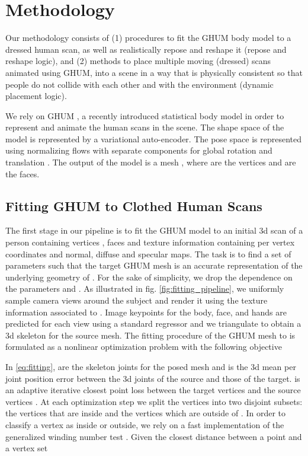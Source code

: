 \documentclass[10pt,twocolumn,letterpaper]{article}
\begin{document}
\section{Methodology}

Our methodology consists of (1) procedures to fit the GHUM body model to a dressed human scan, as well as realistically repose and reshape it (repose and reshape logic), and (2) methods to place multiple moving (dressed) scans animated using GHUM, into a scene in a way that is physically consistent so that people do not collide with each other and with the environment (dynamic placement logic).

 We rely on GHUM \cite{ghum2020}, a recently introduced statistical body model in order to represent and animate the human scans in the scene. The shape space  of the model is represented by a variational auto-encoder.
The pose space  is represented using normalizing flows \cite{zanfir2020weakly} with separate components for global rotation   \cite{zhou2018continuity} and translation . The output of the model is a mesh , where  are the vertices and  are the  faces.

\subsection{Fitting GHUM to Clothed Human Scans}
The first stage in our pipeline is to fit the GHUM\cite{ghum2020} model to an initial 3d scan of a person  containing  vertices , faces  and texture information  containing per vertex  coordinates and normal, diffuse and specular maps. The task is to find a set of parameters  such that the target GHUM\cite{ghum2020} mesh  is an accurate representation of the underlying geometry of . For the sake of simplicity, we drop the dependence on the parameters  and . As illustrated in fig. \ref{fig:fitting_pipeline}, we uniformly sample camera views around the subject and render it using the texture information associated to . Image keypoints for the body, face, and hands are predicted for each view using a standard regressor \cite{ghum2020,bazarevsky2020blazepose} and we triangulate to obtain a 3d skeleton  for the source mesh. The fitting procedure of the GHUM mesh  to  is formulated as a nonlinear optimization problem with the following objective

In \eqref{eq:fitting},  are the skeleton joints for the posed mesh  and   is the 3d mean per joint position error between the 3d joints of the source and those of the target.  is an adaptive iterative closest point loss between the target vertices  and the source vertices . At each optimization step we split the vertices  into two disjoint subsets: the vertices  that are inside  and the vertices  which are outside of . In order to classify a vertex as inside or outside, we rely on a fast implementation of the generalized winding number test \cite{Jacobson:WN:2013, fieraru2021remips}. Given the closest distance  between a point  and a vertex set 
\end{document}
